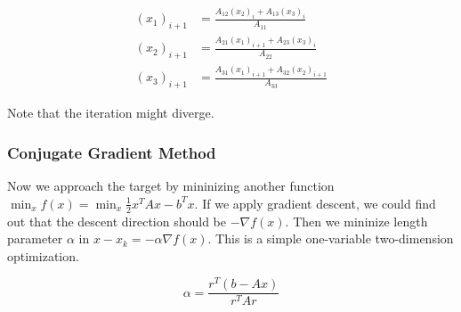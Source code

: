 \begin{align}
  (x_1)_{i+1} &= \frac{A_{12}(x_2)_i + A_{13}(x_3)_i}{A_{11}} \nonumber \\
  (x_2)_{i+1} &= \frac{A_{21}(x_1)_{i+1} + A_{23}(x_3)_i}{A_{22}} \nonumber \\
  (x_3)_{i+1} &= \frac{A_{31}(x_1)_{i+1} + A_{32}(x_2)_{i+1}}{A_{33}} \nonumber
\end{align}

Note that the iteration might diverge.

\subsubsection{Conjugate Gradient Method}

Now we approach the target by mininizing another
function $\min_x f(x) = \min_x \frac{1}{2}x^TAx - b^Tx$.
If we apply gradient descent, we could find out that
the descent direction should be $-\nabla f(x)$.
Then we mininize length parameter $\alpha$ in $x - x_k = - \alpha \nabla f(x)$.
This is a simple one-variable two-dimension optimization.

\[
  \alpha = \frac{r^T(b-Ax)}{r^TAr}
\]
